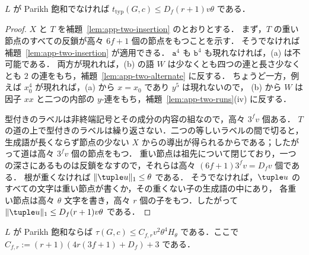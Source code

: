 \begin{proposition}\label{prop:app-two-nonsaturated}
$L$ が Parikh 飽和でなければ $t_{\mathrm{typ}}(G,c)\le D_f(r+1)v\theta$ である．
\end{proposition}

\begin{proof}
$X$ と $T$ を補題~\ref{lem:app-two-insertion} のとおりとする．
まず，$T$ の重い節点のすべての反鎖が高々 $6f+1$ 個の節点をもつことを示す．
そうでなければ補題~\ref{lem:app-two-insertion} が適用できる．
$\mathtt a^4$ も $\mathtt b^4$ も現れなければ，(a) は不可能である．
両方が現れれば，(b) の語 $W$ は少なくとも四つの連と長さ少なくとも $2$ の連をもち，補題~\ref{lem:app-two-alternate} に反する．
ちょうど一方，例えば $x_0^4$ が現れれば，(a) から $x=x_0$ であり $y^5$ は現れないので，
(b) から $W$ は因子 $xx$ と二つの内部の $y$-連をもち，補題~\ref{lem:app-two-runs}(iv) に反する．

型付きのラベルは非終端記号とその成分の内容の組なので，高々 $3^fv$ 個ある．
$T$ の道の上で型付きのラベルは繰り返さない．二つの等しいラベルの間で切ると，
生成語が長くならず節点の少ない $X$ からの導出が得られるからである；したがって道は高々 $3^fv$ 個の節点をもつ．
重い節点は祖先について閉じており，一つの深さにあるものは反鎖をなすので，それらは高々 $(6f+1)3^fv=D_fv$ 個である．
根が重くなければ $\|\tuple u\|_1\le\theta$ である．
そうでなければ，$\tuple u$ のすべての文字は重い節点が書くか，その重くない子の生成語の中にあり，
各重い節点は高々 $\theta$ 文字を書き，高々 $r$ 個の子をもつ．したがって $\|\tuple u\|_1\le D_f(r+1)v\theta$ である．
\end{proof}

\begin{lemma}\label{lem:app-two-saturated}
$L$ が Parikh 飽和ならば $\tau(G,c)\le C_{f,r}v^2\theta^4H_\theta$ である．ここで $C_{f,r}:=(r+1)(4r(3f+1)+D_f)+3$ である．
\end{lemma}

